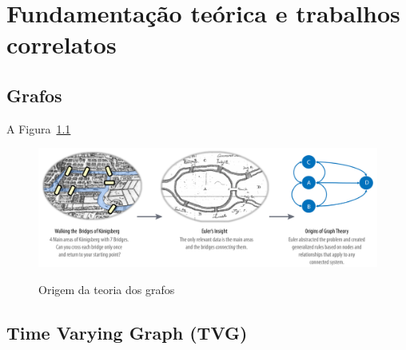
\chapter{Fundamentação teórica e trabalhos correlatos}
\label{cap:revisaodaliteratura}



\section{Grafos} \label{sec:grafos}

A  Figura~\ref{fig:graphtheory}

 \begin{figure}[!h]
 \caption{Origem da teoria dos grafos}
     \centering
     \includegraphics[scale=.40]{./Capitulo2/img/origins-graph-theory.png}
         \label{fig:graphtheory}
 \end{figure}
 
 
\section{Time Varying Graph (TVG)} \label{sec:tvg}

